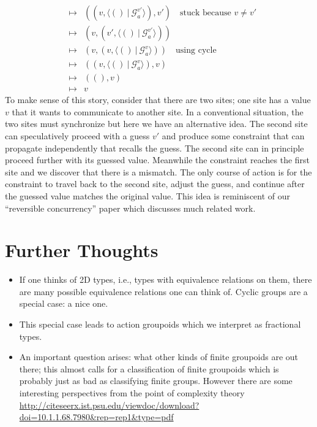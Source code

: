 \documentclass{article}
\newcommand{\G}{\mathcal{G}}
\newcommand{\fv}[2]{\langle #1 ~|~ #2 \rangle}
\begin{document}
\begin{itemize}
\[\begin{array}{rcl}
&\mapsto& ((v , \fv{()}{\G_a^{v'}}), v')  \quad \mbox{stuck~because~} v \neq v' \\
&\mapsto& (v , (v' , \fv{()}{\G_a^{v'}})) \\
&\mapsto& (v , (v , \fv{()}{\G_a^{v}})) \quad \mbox{using~cycle} \\
&\mapsto& ((v , \fv{()}{\G_a^{v}}), v)  \\
&\mapsto& ((), v) \\
&\mapsto& v
\end{array}\]
To make sense of this story, consider that there are two sites; one site has a value $v$ that it wants to communicate to another site. In a conventional situation, the two sites must synchronize but here we have an alternative idea. The second site can speculatively proceed with a guess $v'$ and produce some constraint that can propagate independently that recalls the guess. The second site can in principle proceed further with its guessed value. Meanwhile the constraint reaches the first site and we discover that there is a mismatch. The only
course of action is for the constraint to travel back to the second site, adjust the guess, and continue after the guessed value matches the original value. This idea is reminiscent of our ``reversible concurrency'' paper which discusses much related work. 
\end{itemize}

\section{Further Thoughts}

\begin{itemize}
\item If one thinks of 2D types, i.e., types with equivalence
  relations on them, there are many possible equivalence relations one
  can think of. Cyclic groups are a special case: a nice one.

\item This special case leads to action groupoids which we interpret
  as fractional types. 

\item An important question arises: what other kinds of finite
  groupoids are out there; this almost calls for a classification of
  finite groupoids which is probably just as bad as classifying finite
  groups. However there are some interesting perspectives from the
  point of complexity theory
  \url{http://citeseerx.ist.psu.edu/viewdoc/download?doi=10.1.1.68.7980&rep=rep1&type=pdf}

\end{itemize}

\end{document}
